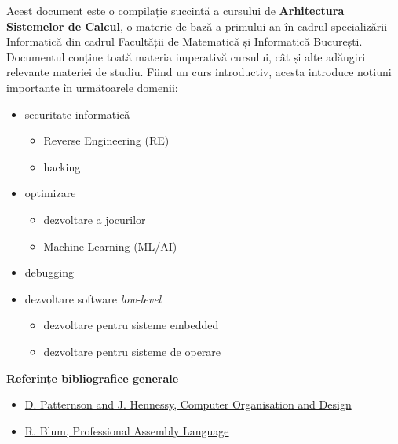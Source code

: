 \documentclass[a4paper,10pt]{article}
\begin{document}
\quad Acest document este o compilație succintă a cursului de \textbf{Arhitectura Sistemelor de Calcul}, o materie de bază a primului an în cadrul specializării Informatică din cadrul Facultății de Matematică și Informatică București.
\quad Documentul conține toată materia imperativă cursului, cât și alte adăugiri relevante materiei de studiu. \newline \quad Fiind un curs introductiv, acesta introduce noțiuni importante în următoarele domenii:
\begin{itemize}
    \item securitate informatică
    \begin{itemize}
        \item Reverse Engineering (RE)
        \item hacking
    \end{itemize}
    \item optimizare
    \begin{itemize}
        \item dezvoltare a jocurilor
        \item Machine Learning (ML/AI)
    \end{itemize}
    \item debugging
    \item dezvoltare software \textit{low-level}
    \begin{itemize}
        \item dezvoltare pentru sisteme embedded
        \item dezvoltare pentru sisteme de operare
    \end{itemize}
\end{itemize}
\textbf{Referințe bibliografice generale}
\begin{itemize}
    \item \href{https://www.google.com/url?sa=t&rct=j&q=&esrc=s&source=web&cd=&cad=rja&uact=8&ved=2ahUKEwjt2ZXGo4CPAxW2SfEDHZXIFQ8QFnoECC8QAQ&url=https%3A%2F%2Fia601209.us.archive.org%2F24%2Fitems%2FComputerOrganizationAndDesign3rdEdition%2F-computer%2520organization%2520and%2520design%25203rd%2520edition.pdf&usg=AOvVaw1pgFBveFHAibz19Tz7R-6D&opi=89978449}{D. Patternson and J. Hennessy, Computer Organisation and Design}
    \item \href{https://www.google.com/url?sa=t&rct=j&q=&esrc=s&source=web&cd=&ved=2ahUKEwjv3JPjpICPAxWNQ_EDHc0gLvoQFnoECB0QAQ&url=https%3A%2F%2Farchive.org%2Fdownload%2FProfessional_Assembly_Language_2005%2FProfessional_Assembly_Language_2005.pdf&usg=AOvVaw3TJSBH1Y0pcpnMmrMsjSPH&opi=89978449}{R. Blum, Professional Assembly Language}
\end{itemize}
\end{document}
